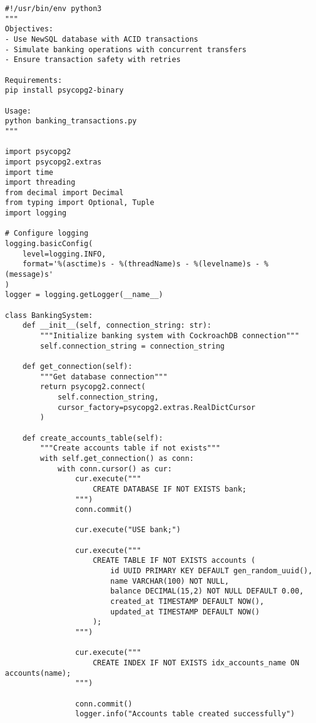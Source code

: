 \begin{verbatim}
#!/usr/bin/env python3
"""
Objectives:
- Use NewSQL database with ACID transactions
- Simulate banking operations with concurrent transfers
- Ensure transaction safety with retries

Requirements:
pip install psycopg2-binary

Usage:
python banking_transactions.py
"""

import psycopg2
import psycopg2.extras
import time
import threading
from decimal import Decimal
from typing import Optional, Tuple
import logging

# Configure logging
logging.basicConfig(
    level=logging.INFO,
    format='%(asctime)s - %(threadName)s - %(levelname)s - %(message)s'
)
logger = logging.getLogger(__name__)

class BankingSystem:
    def __init__(self, connection_string: str):
        """Initialize banking system with CockroachDB connection"""
        self.connection_string = connection_string

    def get_connection(self):
        """Get database connection"""
        return psycopg2.connect(
            self.connection_string,
            cursor_factory=psycopg2.extras.RealDictCursor
        )

    def create_accounts_table(self):
        """Create accounts table if not exists"""
        with self.get_connection() as conn:
            with conn.cursor() as cur:
                cur.execute("""
                    CREATE DATABASE IF NOT EXISTS bank;
                """)
                conn.commit()

                cur.execute("USE bank;")

                cur.execute("""
                    CREATE TABLE IF NOT EXISTS accounts (
                        id UUID PRIMARY KEY DEFAULT gen_random_uuid(),
                        name VARCHAR(100) NOT NULL,
                        balance DECIMAL(15,2) NOT NULL DEFAULT 0.00,
                        created_at TIMESTAMP DEFAULT NOW(),
                        updated_at TIMESTAMP DEFAULT NOW()
                    );
                """)

                cur.execute("""
                    CREATE INDEX IF NOT EXISTS idx_accounts_name ON accounts(name);
                """)

                conn.commit()
                logger.info("Accounts table created successfully")


\end{verbatim}

